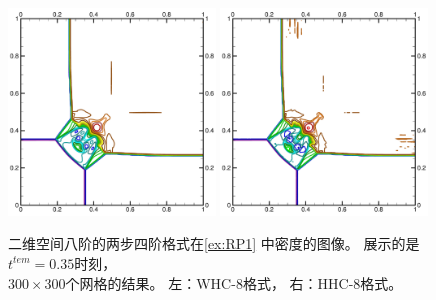 \begin{figure}[htbp]
  \centering
  \includegraphics[width=0.49\textwidth]{fig/2D/RP1_S2O4-WHC8_CFL0.500000.pdf}
  \includegraphics[width=0.49\textwidth]{fig/2D/RP1_S2O4-HHC8theta200000_CFL0.500000.pdf}
  \caption{二维空间八阶的两步四阶格式在\cref{ex:RP1} 中密度的图像。
    展示的是$t^{tem}=0.35$时刻，
    \\$300 \times 300$个网格的结果。
    左：WHC-8格式，
    右：HHC-8格式。
  }
  \label{fig:RP1-8}
\end{figure}

